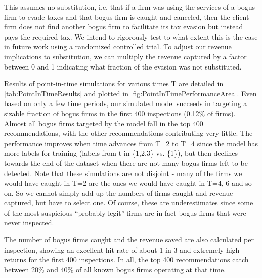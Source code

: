 This assumes no substitution, i.e. that if a firm was using the services of a bogus firm to evade taxes and that bogus firm is caught and canceled, then the client firm does not find another bogus firm to facilitate its tax evasion but instead pays the required tax. We intend to rigorously test to what extent this is the case in future work using a randomized controlled trial. To adjust our revenue implications to substitution, we can multiply the revenue captured by a factor between 0 and 1 indicating what fraction of the evasion was not substituted.

Results of point-in-time simulations for various times T are detailed in \cref{tab:PointInTimeResults} and plotted in \cref{fig:PointInTimePerformanceArea}. Even based on only a few time periods, our simulated model succeeds in targeting a sizable fraction of bogus firms in the first 400 inspections (0.12\% of firms). Almost all bogus firms targeted by the model fall in the top 400 recommendations, with the other recommendations contributing very little. The performance improves when time advances from T=2 to T=4 since the model has more labels for training (labels from t in \{1,2,3\} vs. \{1\}), but then declines towards the end of the dataset when there are not many bogus firms left to be detected. Note that these simulations are not disjoint - many of the firms we would have caught in T=2 are the ones we would have caught in T=4, 6 and so on. So we cannot simply add up the numbers of firms caught and revenue captured, but have to select one. Of course, these are underestimates since some of the most suspicious ``probably legit'' firms are in fact bogus firms that were never inspected.

The number of bogus firms caught and the revenue saved are also calculated per inspection, showing an excellent hit rate of about 1 in 3 and extremely high returns for the first 400 inspections.  In all, the top 400 recommendations catch between 20\% and 40\% of all known bogus firms operating at that time.

